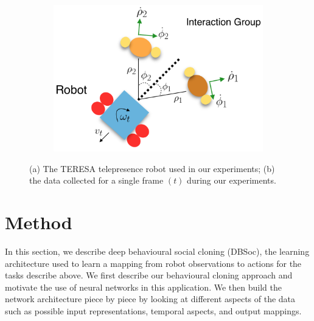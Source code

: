 \documentclass[letterpaper, 10 pt, conference]{ieeeconf}
\begin{document}
\begin{figure}[tbh]
\begin{subfigure}[b]{0.35\columnwidth}
    \caption{}
    \label{fig:robot}
  \end{subfigure}
  \begin{subfigure}[b]{0.35\columnwidth}

    \includegraphics[scale = 0.19]{images/data.png}
  \vspace{5mm}
    \caption{}
       \label{fig:data-pic}
  \end{subfigure} 

  \caption{(a) The TERESA telepresence robot used in our experiments; (b) the data collected for a single frame $(t)$ during our experiments.}

    \vspace{-2mm}
  \label{fig:data_robot}
  \end{figure}

\section{Method}
 In this section, we describe deep behavioural social cloning (DBSoc), the learning architecture used to learn a mapping from robot observations to actions for the tasks describe above.  We first describe our behavioural cloning approach and motivate the use of neural networks in this application. We then build the network architecture piece by piece by looking at different aspects of the data such as possible input representations, temporal aspects, and output mappings. 
\end{document}
